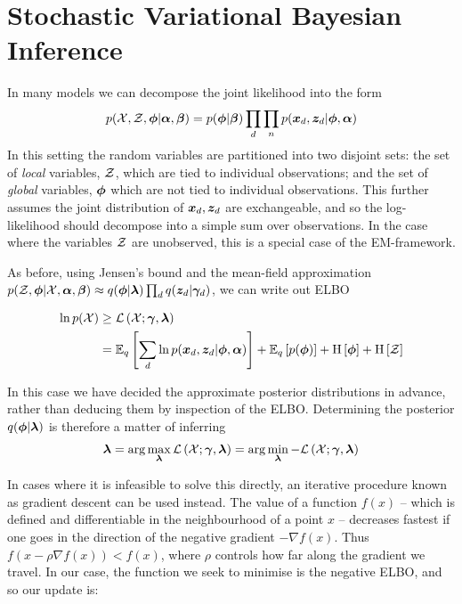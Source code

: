 \section{Stochastic Variational Bayesian Inference}
In many models we can decompose the joint likelihood into the form
\begin{align}
p({ \mathcal{X} }, { \mathcal{Z} }, { \bm \phi } | \bm \alpha,\bm \beta) = p({ \bm \phi } | \bm \beta)  \prod_d \prod_n p({ \bm x_d }, { \bm z_d } | { \bm \phi }, \bm \alpha) \label{eqn:svi-joint-likely}
\end{align}
In this setting the random variables are partitioned into two disjoint sets: the set of \emph{local} variables, ${ \mathcal{Z} }$, which are tied to individual observations; and the set of \emph{global} variables, $\bm \phi$ which are not tied to individual observations. This further assumes the joint distribution of ${ \bm x_d }, { \bm z_d }$ are exchangeable, and so the log-likelihood should decompose into a simple sum over observations. In the case where the variables ${ \mathcal{Z} }$ are unobserved, this is a special case of the EM-framework.

\newcommand \varparam { { \vv{\lambda} } }
\newcommand \elbo { { \mathcal{L}\left(\xdat; \vv{\gamma}, \varparam \right)  } }
\newcommand \elbot[1] { { \mathcal{L}\left(\xdat; \vv{\gamma}, \varparam^{{#1}} \right)  } }

As before, using Jensen's bound and the mean-field approximation $p(\zdat, \param | \xdat, \vv{\alpha},\vv{\beta}) \approx q(\param | \varparam)\prod_d q(\zd|\vv{\gamma}_d)$, we can write out ELBO

\begin{align}
\ln p(\xdat) 
& \geq \elbo \\
& = \ex{\sum_d \ln p(\xd, \zd | \param, \vv{\alpha})}{q} + \ex{p(\param)}{q} + \ent{\param} + \ent{\zdat}
\end{align}

In this case we have decided the approximate posterior distributions in advance, rather than deducing them by inspection of the ELBO. Determining the posterior $q(\param|\varparam)$ is therefore a matter of inferring
\begin{align}
\varparam = \arg \max_\varparam \elbo = \arg \min_\varparam -\elbo
\end{align}

In cases where it is infeasible to solve this directly, an iterative procedure known as gradient descent can be used instead. The value of a function $f(x)$ -- which is defined and differentiable in the neighbourhood of a point $x$ -- decreases fastest if one goes in the direction of the negative gradient $-\nabla f(x)$. Thus $f(x - \rho \nabla f(x)) < f(x)$, where $\rho$ controls how far along the gradient we travel. In our case, the function we seek to minimise is the negative ELBO, and so our update is:

